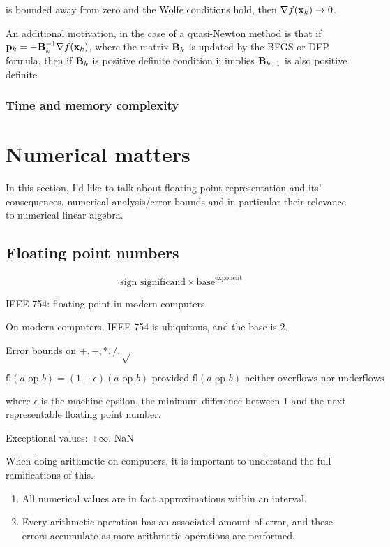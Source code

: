 \documentclass{amsart}[12pt]
\begin{document}
is bounded away from zero and the Wolfe conditions hold, then $\nabla f({\bf x}_k) \to 0$.

An additional motivation, in the case of a quasi-Newton method is that if ${\bf p}_k = - {\bf B}_k^{-1} \nabla f({\bf x}_k)$,
where the matrix ${\bf B}_k$ is updated by the BFGS or DFP formula, then if ${\bf B}_k$ is positive definite condition ii
implies ${\bf B}_{k+1}$ is also positive definite.

\subsubsection{Time and memory complexity}

\section{Numerical matters}

In this section, I'd like to talk about floating point representation and its' consequences, numerical
analysis/error bounds and in particular their relevance to numerical linear algebra.

\subsection{Floating point numbers}

$$\text{sign } \text{significand} \times \text{base}^\text{exponent}$$

IEEE 754: floating point in modern computers

On modern computers, IEEE 754 is ubiquitous, and the base is $2$.

Error bounds on $+, -, *, /, \sqrt{}$

$$
\text{fl}(a \text{ op } b) = (1 + \epsilon) (a \text{ op } b) \text{ provided $\text{fl}(a \text{ op } b)$ neither overflows nor underflows}
$$

where $\epsilon$ is the machine epsilon, the minimum difference between $1$ and the next representable
floating point number.

Exceptional values: $\pm \infty$, $\text{NaN}$

When doing arithmetic on computers, it is important to understand the full ramifications of this.

\begin{enumerate}
\item All numerical values are in fact approximations within an interval.
\item Every arithmetic operation has an associated amount of error, and these errors accumulate as more
			arithmetic operations are performed.
\end{enumerate}
\end{document}
